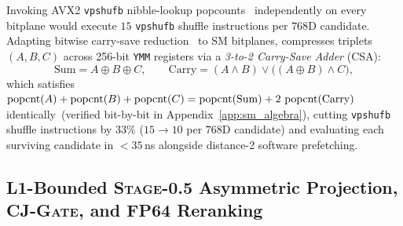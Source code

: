 Invoking {AVX2} \texttt{vpshufb} nibble-lookup popcounts~\cite{mula2018faster} independently on every bitplane would execute $15$ \texttt{vpshufb} shuffle instructions per $768$D candidate.
Adapting bitwise carry-save reduction~\cite{mula2018faster} to {SM} bitplanes, \rquiver{} compresses triplets $(A, B, C)$ across 256-bit \texttt{YMM} registers via a \emph{3-to-2 Carry-Save Adder} ({CSA}):
\begin{equation}
  \mathrm{Sum} = A \oplus B \oplus C, \qquad
  \mathrm{Carry} = (A \wedge B) \vee \bigl((A \oplus B) \wedge C\bigr),
  \label{eq:csa_identity}
\end{equation}
which satisfies $\operatorname{popcnt}(A) + \operatorname{popcnt}(B) + \operatorname{popcnt}(C) = \operatorname{popcnt}(\mathrm{Sum}) + 2\,\operatorname{popcnt}(\mathrm{Carry})$ identically\ifpreprint\ (verified bit-by-bit in Appendix~\ref{app:sm_algebra})\fi, cutting \texttt{vpshufb} shuffle instructions by $33\%$ ($15 \to 10$ per $768$D candidate) and evaluating each surviving candidate in $<35$\,ns alongside distance-2 software prefetching.

\subsection{L1-Bounded \textsc{Stage-0.5} Asymmetric Projection, \textsc{CJ-Gate}, and FP64 Reranking}
\label{subsec:stage05_rerank}

